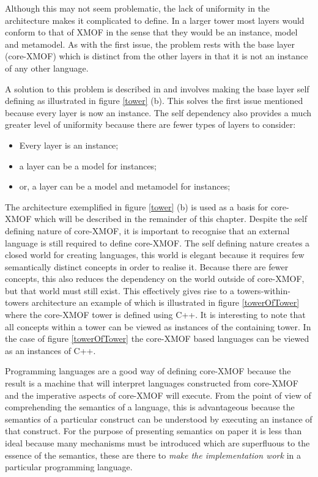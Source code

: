 \noindent Although this may not seem problematic, the lack of uniformity in the architecture makes it complicated to define.  In a larger tower most layers would conform to that of XMOF in the sense that they would be an instance, model and metamodel.  As with the first issue, the problem rests with the base layer (core-XMOF) which is distinct from the other layers in that it is not an instance of any other language.

A solution to this problem is described in \cite{objVlisp} and involves making the base layer self defining as illustrated in figure \ref{tower} (b).  This solves the first issue mentioned because every layer is now an instance.  The self dependency also provides a much greater level of uniformity because there are fewer types of layers to consider:

\pagebreak
\begin{itemize}
\item Every layer is an instance;
\item a layer can be a model for instances;
\item or, a layer can be a model and metamodel for instances;
\end{itemize}

The architecture exemplified in figure \ref{tower} (b) is used as a basis for core-XMOF which will be described in the remainder of this chapter.  Despite the self defining nature of core-XMOF, it is important to recognise that an external language is still required to define core-XMOF.  The self defining nature creates a closed world for creating languages, this world is elegant because it requires few semantically distinct concepts in order to realise it.  Because there are fewer concepts, this also reduces the dependency on the world outside of core-XMOF, but that world must still exist.  This effectively gives rise to a towers-within-towers architecture an example of which is illustrated in figure \ref{towerOfTower} where the core-XMOF tower is defined using C++.  It is interesting to note that all concepts within a tower can be viewed as instances of the containing tower.  In the case of figure \ref{towerOfTower} the core-XMOF based languages can be viewed as an instances of C++.

Programming languages are a good way of defining core-XMOF because the result is a machine that will interpret languages constructed from core-XMOF and the imperative aspects of core-XMOF will execute.  From the point of view of comprehending the semantics of a language, this is advantageous because the semantics of a particular construct can be understood by executing an instance of that construct.  For the purpose of presenting semantics on paper it is less than ideal because many mechanisms must be introduced which are superfluous to the essence of the semantics, these are there to \emph{make the implementation work} in a particular programming language.

